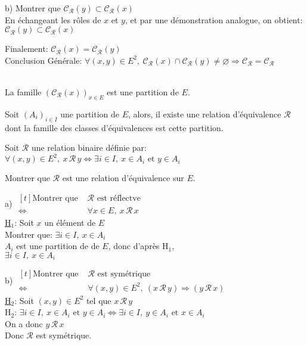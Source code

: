 \documentclass[12pt,twoside,a4paper]{article}
\begin{document}
\begin{preuve}
\begin{liste}
\begin{liste}
						\item[b)] Montrer que $\mathcal{C_R}(y)\subset \mathcal{C_R}(x)$\\
							En \'echangeant les rôles de $x$ et $y$, et par une d\'emonstration analogue, on obtient:\\
							$\mathcal{C_R}(y)\subset \mathcal{C_R}(x)$
					\end{liste}
					Finalement: $\mathcal{C_R}(x)=\mathcal{C_R}(y)$\\
					Conclusion G\'en\'erale: $\forall(x,y)\in E^2,\ \mathcal{C_R}(x)\cap\mathcal{C_R}(y)\neq\varnothing\Rightarrow\mathcal{C_R}=\mathcal{C_R}$
			\end{liste}\ \\
			La famille $(\mathcal{C_R}(x))_{x\in E}$ est une partition de $E$.
		\end{preuve}
		\begin{prop}
			Soit $\left(A_i\right)_{i\in I}$ une partition de $E$, alors, il existe une relation d'\'equivalence $\mathcal{R}$ dont la famille des classes d'\'equivalences est cette partition.
		\end{prop}
		\begin{preuve}
			Soit $\mathcal{R}$ une relation binaire d\'efinie par:\\
			$\forall(x,y)\in E^2,\ x\,\mathcal{R}\,y\iff\exists i\in I,\ x\in A_i\text{ et }y\in A_i$
			\begin{liste}
				\item[\cercle{1}] Montrer que $\mathcal{R}$ est une relation d'\'equivalence sur $E$.\\
				\begin{liste}
					\item[a)] $\begin{aligned}[t]\text{Montrer que }&\mathcal{R}\text{ est r\'eflectve}\\
						\iff&\forall x\in E,\ x\,\mathcal{R}\,x\end{aligned}$\\
						\underline{H$_1$}: Soit $x$ un \'el\'ement de $E$\\
						Montrer que: $\exists i\in I,\ x\in A_i$\\
						$A_i$ est une partition de de $E$, donc d'apr\`es H$_1$,\\
						$\exists i\in I,\ x\in A_i$
					\item[b)]  $\begin{aligned}[t]\text{Montrer que }&\mathcal{R}\text{ est sym\'etrique}\\
						\iff&\forall (x,y)\in E^2,\ (x\,\mathcal{R}\,y)\Rightarrow(y\,\mathcal{R}\,x)\end{aligned}$\\
						\underline{H$_2$}: Soit $(x,y)\in E^2$ tel que $x\,\mathcal{R}\,y$\\
						H$_2$: $\exists i\in I,\ x\in A_i\text{ et }y\in A_i\iff\exists i\in I,\ y\in A_i \text{ et } x\in A_i$\\
						On a donc $y\,\mathcal{R}\,x$\\
						Donc $\mathcal{R}$ est sym\'etrique.
				\end{liste}
			\end{liste}
		\end{preuve}
\end{document}
